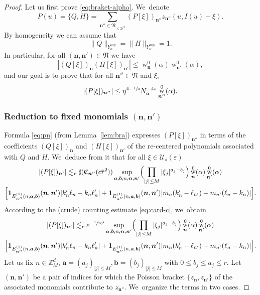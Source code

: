 \documentclass[10pt,a4paper]{amsart}
\DeclareMathOperator{\rw}{w}
\theoremstyle{plain}
\theoremstyle{definition}
\newcommand{\nb}{{\boldsymbol n}}
\newcommand{\Nb}{{\boldsymbol{\mathfrak{N}}}}
\newcommand{\Z}{\mathbb{Z}}
\newcommand{\1}{\mathbf{1}}
\newcommand{\Ysup}[1]{Y_{#1}^{\mathrm{sup}}}
\let\epsilon\varepsilon
\begin{document}
\begin{proof}
Let us first prove \eqref{eq:braket-alpha}. We~denote
\[
P(u) = \{Q,H\} = \sum_{\nb''\in\Nb_{\leq2\overline{r}^{2}}}(P[\xi])_{\nb''}z_{\nb''}(u,I(u)-\xi).
\]
By homogeneity we can assume that
\[
\|Q\|_{\Ysup{\alpha}} = \|H\|_{\Ysup{\alpha}} =1.
\]
In particular, for all $(\nb,\nb')\in\Nb$ we have
\[
|(Q[\xi])_{\nb}(H[\xi])_{\nb'}| \leq \rw_{\nb}^{0}(\alpha)\rw_{\nb'}^{0}(\alpha),
\]
and our goal is to prove that for all $\nb''\in\Nb$ and $\xi$,
\[
|(P[\xi])_{\nb''}|
\leq
\eta^{4-\sfrac{1}{4}}
N_{\alpha}^{-4s}
\rw_{\nb''}^{0}(\alpha).
\]
\subsubsection*{Reduction to fixed monomials $(\nb,\nb')$} Formula \eqref{eq:pn} (from Lemma~\ref{lem:bra}) expresses $(P[\xi])_{\nb''}$ in terms of the coefficients $(
Q[\xi])_{\nb}$ and $(H[\xi])_{\nb'}$ of the re-centered polynomials associated with $Q$ and $H$. We~deduce from it that for all $\xi\in\mathcal{U}_{s}(\epsilon)$
\begin{multline*}
|(P[\xi])_{\nb'}| \lesssim_{ r}\sharp(\mathfrak{C}_{\nb''}(c\overline{r}^{2}))
\sup_{\boldsymbol{a},\boldsymbol{b},n,\nb,\nb'}
\Bigl(\prod_{|j|\leq M}|\xi_{j}|^{a_{j}-b_{j}}\Bigr)
\rw_{\nb}^{0}(\alpha)\rw_{\nb'}^{0}(\alpha)
\\
\Big[\mathbf{1}_{E_{\nb''}^{(1)}(n,\boldsymbol{a},\boldsymbol{b})}(\nb,\nb')
|k_{n}'\ell_{n}-k_{n}\ell_{n}'|
+\mathbf{1}_{E_{\nb''}^{(1)}(n,\boldsymbol{a},\boldsymbol{b})}(\nb,\nb')
|m_{n}(k_{n}'-\ell_{n'})+m_{n'}(\ell_{n}-k_{n})|
\Big].
\end{multline*}
According to the (crude) counting estimate \eqref{eq:card-c}, we~obtain
\begin{multline}
|(P[\xi])_{\nb'}|\lesssim_{r}\epsilon^{-\sfrac{1}{10^{4}}}
\sup_{\boldsymbol{a},\boldsymbol{b},n,\nb,\nb'}
\Bigl(\prod_{|j|\leq M}|\xi_{j}|^{a_{j}-b_{j}}\Bigr)\rw_{\nb}^{0}(\alpha)\rw_{\nb'}^{0}(\alpha) \\
\Big[\mathbf{1}_{E_{\nb''}^{(1)}(n,\boldsymbol{a},\boldsymbol{b})}(\nb,\nb')
|k_{n}'\ell_{n}-k_{n}\ell_{n}'|
+\mathbf{1}_{E_{\nb''}^{(1)}(n,\boldsymbol{a},\boldsymbol{b})}(\nb,\nb')
|m_{n}(k_{n}'-\ell_{n'})+m_{n'}(\ell_{n}-k_{n})|
\Big].
\label{eq:pogi}
\end{multline}
Let us fix $n\in\Z_{M}^{d}$, $\boldsymbol{a}=(a_{j})_{|j|\leq M}, \boldsymbol{b} = (b_{j})_{|j|\leq M}$ with $0\leq b_{j}\leq a_{j}\leq \overline{r}$. Let $(\nb,\nb')$ be a pair of indices for which the Poisson bracket $\{z_{\nb},z_{\nb'}\}$ of the associated monomials contribute to $z_{\nb''}$. We~organize the terms in two cases.


\end{proof}
\end{document}
